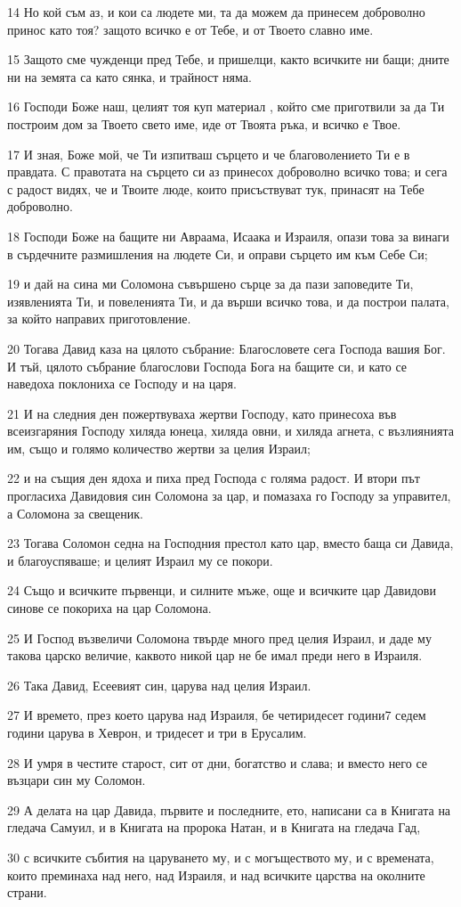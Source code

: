 \par 14 Но кой съм аз, и кои са людете ми, та да можем да принесем доброволно принос като тоя? защото всичко е от Тебе, и от Твоето славно име.
\par 15 Защото сме чужденци пред Тебе, и пришелци, както всичките ни бащи; дните ни на земята са като сянка, и трайност няма.
\par 16 Господи Боже наш, целият тоя куп материал , който сме приготвили за да Ти построим дом за Твоето свето име, иде от Твоята ръка, и всичко е Твое.
\par 17 И зная, Боже мой, че Ти изпитваш сърцето и че благоволението Ти е в правдата. С правотата на сърцето си аз принесох доброволно всичко това; и сега с радост видях, че и Твоите люде, които присъствуват тук, принасят на Тебе доброволно.
\par 18 Господи Боже на бащите ни Авраама, Исаака и Израиля, опази това за винаги в сърдечните размишления на людете Си, и оправи сърцето им към Себе Си;
\par 19 и дай на сина ми Соломона съвършено сърце за да пази заповедите Ти, изявленията Ти, и повеленията Ти, и да върши всичко това, и да построи палата, за който направих приготовление.
\par 20 Тогава Давид каза на цялото събрание: Благословете сега Господа вашия Бог. И тъй, цялото събрание благослови Господа Бога на бащите си, и като се наведоха поклониха се Господу и на царя.
\par 21 И на следния ден пожертвуваха жертви Господу, като принесоха във всеизгаряния Господу хиляда юнеца, хиляда овни, и хиляда агнета, с възлиянията им, също и голямо количество жертви за целия Израил;
\par 22 и на същия ден ядоха и пиха пред Господа с голяма радост. И втори път прогласиха Давидовия син Соломона за цар, и помазаха го Господу за управител, а Соломона за свещеник.
\par 23 Тогава Соломон седна на Господния престол като цар, вместо баща си Давида, и благоуспяваше; и целият Израил му се покори.
\par 24 Също и всичките първенци, и силните мъже, още и всичките цар Давидови синове се покориха на цар Соломона.
\par 25 И Господ възвеличи Соломона твърде много пред целия Израил, и даде му такова царско величие, каквото никой цар не бе имал преди него в Израиля.
\par 26 Така Давид, Есеевият син, царува над целия Израил.
\par 27 И времето, през което царува над Израиля, бе четиридесет години7 седем години царува в Хеврон, и тридесет и три в Ерусалим.
\par 28 И умря в честите старост, сит от дни, богатство и слава; и вместо него се възцари син му Соломон.
\par 29 А делата на цар Давида, първите и последните, ето, написани са в Книгата на гледача Самуил, и в Книгата на пророка Натан, и в Книгата на гледача Гад,
\par 30 с всичките събития на царуването му, и с могъществото му, и с времената, които преминаха над него, над Израиля, и над всичките царства на околните страни.

